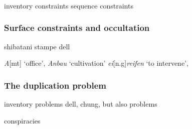 

\subsubsection{\citealt{Stanley1967}}

inventory constraints
sequence constraints

\subsubsection{Surface constraints and occultation}

shibatani
stampe
dell

\emph{A}[mt] `office', \emph{Anbau} `cultivation'
\emph{ei}[n.g]\emph{reifen} `to intervene',

\subsubsection{The duplication problem}

inventory problems 
dell, chung, but also problems

conspiracies
